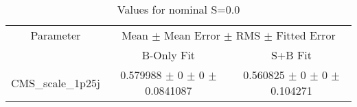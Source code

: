 \begin{table}
\centering
\caption{Values for nominal S=0.0}
\begin{tabular}{ccc}
\toprule
Parameter & \multicolumn{2}{c}{Mean $\pm$ Mean Error $\pm$ RMS $\pm$ Fitted Error}\\
 & B-Only Fit & S+B Fit\\
\midrule
CMS\_scale\_1p25j & \num{0.579988} $\pm$ \num{0} $\pm$ \num{0} $\pm$ \num{0.0841087} & \num{0.560825} $\pm$ \num{0} $\pm$ \num{0} $\pm$ \num{0.104271}\\
\bottomrule
\end{tabular}
\end{table}